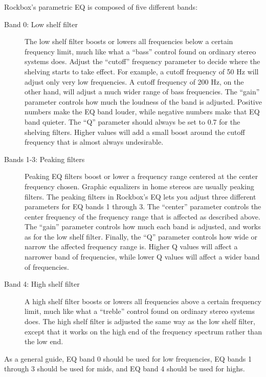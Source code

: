 {  Rockbox's parametric EQ is composed of five different bands:
  \begin{description}
  \item[Band 0: Low shelf filter]
        The low shelf filter boosts or lowers all frequencies below a certain
        frequency limit, much like what a ``bass'' control found on ordinary
        stereo systems does.
        Adjust the ``cutoff'' frequency parameter to decide where the shelving
        starts to take effect. For example, a cutoff frequency of 50 Hz will
        adjust only very low frequencies. A cutoff frequency of 200 Hz, on the
        other hand, will adjust a much wider range of bass frequencies.
        The ``gain'' parameter controls how much the loudness of the band is
        adjusted. Positive numbers make the EQ band louder, while negative
        numbers make that EQ band quieter.
        The ``Q'' parameter should always be set to 0.7 for the shelving
        filters. Higher values will add a small boost around the cutoff
        frequency that is almost always undesirable.
  \item[Bands 1-3: Peaking filters]
        Peaking EQ filters boost or lower a frequency range centered at the
        center frequency chosen.
        Graphic equalizers in home stereos are usually peaking
        filters. The peaking filters in Rockbox's EQ lets you adjust three
        different parameters for EQ bands 1 through 3. The ``center'' parameter
        controls the center frequency of the frequency range that is affected
        as described above.
        The ``gain'' parameter controls how much each band is adjusted, and
        works as for the low shelf filter.
        Finally, the ``Q'' parameter controls how wide or narrow the affected
        frequency range is. Higher Q values will affect a narrower band of
        frequencies, while lower Q values will affect a wider band of
        frequencies.
  \item[Band 4: High shelf filter]
        A high shelf filter boosts or lowers all frequencies above a certain
        frequency limit, much like what a ``treble'' control found on ordinary
        stereo systems does.
        The high shelf filter is adjusted the same way as the low shelf filter,
        except that it works on the high end of the frequency spectrum rather
        than the low end.
  \end{description}
  As a general guide, EQ band 0 should be used for low frequencies, EQ bands 1
  through 3 should be used for mids, and EQ band 4 should be used for highs.

}
